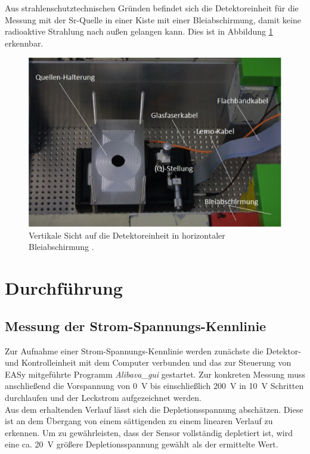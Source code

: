 Aus strahlenschutztechnischen Gründen befindet sich die Detektoreinheit für die Messung mit der Sr-Quelle in einer Kiste mit einer Bleiabschirmung, damit keine radioaktive Strahlung nach außen gelangen kann. Dies ist in Abbildung \ref{fig:quell} erkennbar.
\begin{figure}[htb]
  \centering
  \includegraphics{graphics/Abschirmung.png}
  \caption{Vertikale Sicht auf die Detektoreinheit in horizontaler Bleiabschirmung \cite{anleitung}.}
  \label{fig:quell}
\end{figure}

\FloatBarrier
\section{Durchführung}
\label{sec:Durchführung}

\subsection{Messung der Strom-Spannungs-Kennlinie}
\label{sec:Kennlinie}
Zur Aufnahme einer Strom-Spannungs-Kennlinie werden zunächste die Detektor- und Kontrolleinheit mit dem Computer verbunden und das zur Steuerung von EASy mitgeführte Programm \textit{Alibava\_gui} gestartet. Zur konkreten Messung muss anschließend die Vorspannung von \SI{0}{\volt} bis einschließlich \SI{200}{\volt} in \SI{10}{\volt} Schritten durchlaufen und der Leckstrom aufgezeichnet werden.\\
Aus dem erhaltenden Verlauf lässt sich die Depletionsspannung abschätzen. Diese ist an dem Übergang von einem sättigenden zu einem linearen Verlauf zu erkennen. Um zu gewährleisten, dass der Sensor vollständig depletiert ist, wird eine ca. \SI{20}{\volt} größere Depletionsspannung gewählt als der ermittelte Wert.


